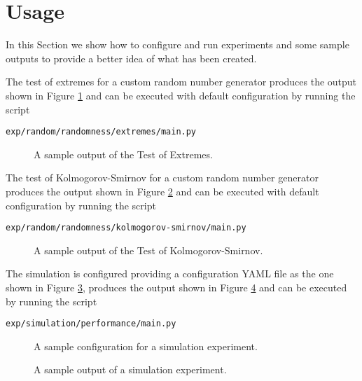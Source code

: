 \section{Usage}
\label{sec:usage}


In this Section we show how to configure and run experiments and some sample outputs to provide a better idea of what has been created.

The test of extremes for a custom random number generator produces the output shown in Figure \ref{fig:usage-randomness-extremes} and can be executed with default configuration by running the script

\begin{lstlisting}
exp/random/randomness/extremes/main.py
\end{lstlisting}

\begin{figure}
	\centering
	
	\caption{A sample output of the Test of Extremes.}
	\label{fig:usage-randomness-extremes}
\end{figure}

The test of Kolmogorov-Smirnov for a custom random number generator produces the output shown in Figure \ref{fig:usage-randomness-kolmogorov-smirnov} and can be executed with default configuration by running the script

\begin{lstlisting}
exp/random/randomness/kolmogorov-smirnov/main.py
\end{lstlisting}

\begin{figure}
	\centering
	
	\caption{A sample output of the Test of Kolmogorov-Smirnov.}
	\label{fig:usage-randomness-kolmogorov-smirnov}
\end{figure}

The simulation is configured providing a configuration YAML file as the one shown in Figure \ref{fig:usage-simulation-configuration}, produces the output shown in Figure \ref{fig:usage-simulation-output} and can be executed by running the script

\begin{lstlisting}
exp/simulation/performance/main.py
\end{lstlisting}

\begin{figure}
	\centering
	
	\caption{A sample configuration for a simulation experiment.}
	\label{fig:usage-simulation-configuration}
\end{figure}

\begin{figure}
	\centering
	
	\caption{A sample output of a simulation experiment.}
	\label{fig:usage-simulation-output}
\end{figure}


